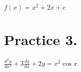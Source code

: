 \documentclass[a4paper,12pt]{article}
\begin{document}
$f(x)= x^2+2x+c$

%
%
%
%
\section*{Practice 3.}

$\displaystyle\frac{d^2y}{dx^2}+3\frac{dy}{dx} +2y=x^2\cos x$
\end{document}
